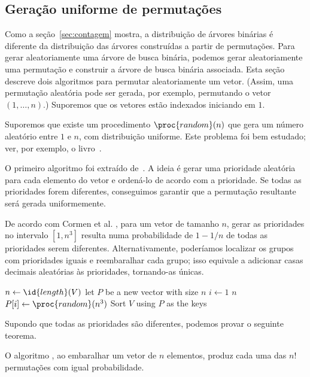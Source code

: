 \subsection{Geração uniforme de permutações}

Como a seção~\ref{sec:contagem} mostra,
a distribuição de árvores binárias é diferente
da distribuição das árvores construídas a partir de permutações.
Para gerar aleatoriamente uma árvore de busca binária,
podemos gerar aleatoriamente uma permutação
e construir a árvore de busca binária associada.
Esta seção descreve dois algoritmos para permutar aleatoriamente um vetor.
(Assim, uma permutação aleatória pode ser gerada, por exemplo,
permutando o vetor $(1, \dots, n)$.)
Suporemos que os vetores estão indexados iniciando em $1$.

Suporemos que existe um procedimento $\proc{random}(n)$
que gera um número aleatório entre $1$ e $n$, com distribuição uniforme.
Este problema foi bem estudado; ver, por exemplo, o livro~\cite{Knuth1997}.

O primeiro algoritmo foi extraído de~\cite[p.125]{CormenLeisersonRivestStein2009}.
A ideia é gerar uma prioridade aleatória para cada elemento do vetor
e ordená-lo de acordo com a prioridade.
Se todas as prioridades forem diferentes,
conseguimos garantir que a permutação resultante será gerada uniformemente.

De acordo com Cormen et al. \cite[p.~125]{CormenLeisersonRivestStein2009},
para um vetor de tamanho $n$,
gerar as prioridades no intervalo $[1, n^3]$ resulta numa probabilidade de $1-1/n$
de todas as prioridades serem diferentes.
Alternativamente, poderíamos localizar os grupos com prioridades iguais
e reembaralhar cada grupo;
isso equivale a adicionar casas decimais aleatórias às prioridades,
tornando-as únicas.

\begin{codebox}
    \li $n \gets \id{length}(V)$
    \li let $P$ be a new vector with size $n$
    \li \For $i \gets 1$ \To $n$
    \li \Do
            $P[i] \gets \proc{random}(n^3)$
    \End
    \li Sort $V$ using $P$ as the keys
\end{codebox}

Supondo que todas as prioridades são diferentes, podemos provar o seguinte teorema.

\begin{proposition}
    O algoritmo ,
    ao embaralhar um vetor de $n$ elementos,
    produz cada uma das $n!$ permutações
    com igual probabilidade.
    \label{thm:shuffle-by-sorting}
\end{proposition}

